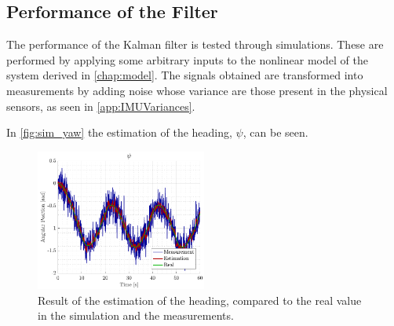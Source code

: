\subsection{Performance of the Filter}
The performance of the Kalman filter is tested through simulations. These are performed by applying some arbitrary inputs to the nonlinear model of the system derived in \autoref{chap:model}. The signals obtained are transformed into measurements by adding noise whose variance are those present in the physical sensors, as seen in \autoref{app:IMUVariances}.

In \autoref{fig:sim_yaw} the estimation of the heading, $\psi$, can be seen.
\begin{figure}[H]
    \includegraphics[width=0.5\textwidth]{figures/sim_yaw}
    \caption{Result of the estimation of the heading, compared to the real value in the simulation and the measurements.}
    \label{fig:sim_yaw}
\end{figure}

